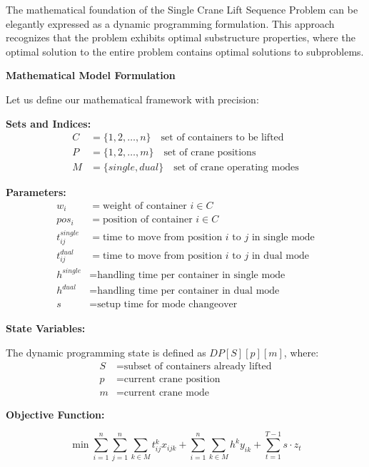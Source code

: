 \documentclass{article}
\begin{document}
The mathematical foundation of the Single Crane Lift Sequence Problem can be elegantly expressed as a dynamic programming formulation. This approach recognizes that the problem exhibits optimal substructure properties, where the optimal solution to the entire problem contains optimal solutions to subproblems.

\textbf{Mathematical Model Formulation}

Let us define our mathematical framework with precision:

\textbf{Sets and Indices:}
\begin{align}
C &= \{1, 2, \ldots, n\} \quad \text{set of containers to be lifted}\\
P &= \{1, 2, \ldots, m\} \quad \text{set of crane positions}\\
M &= \{single, dual\} \quad \text{set of crane operating modes}
\end{align}

\textbf{Parameters:}
\begin{align}
w_i &= \text{weight of container } i \in C\\
pos_i &= \text{position of container } i \in C\\
t_{ij}^{single} &= \text{time to move from position } i \text{ to } j \text{ in single mode}\\
t_{ij}^{dual} &= \text{time to move from position } i \text{ to } j \text{ in dual mode}\\
h^{single} &= \text{handling time per container in single mode}\\
h^{dual} &= \text{handling time per container in dual mode}\\
s &= \text{setup time for mode changeover}
\end{align}

\textbf{State Variables:}

The dynamic programming state is defined as $DP[S][p][m]$, where:
\begin{align}
S &= \text{subset of containers already lifted}\\
p &= \text{current crane position}\\
m &= \text{current crane mode}
\end{align}

\textbf{Objective Function:}

\begin{equation}
\min \sum_{i=1}^{n} \sum_{j=1}^{n} \sum_{k \in M} t_{ij}^k x_{ijk} + \sum_{i=1}^{n} \sum_{k \in M} h^k y_{ik} + \sum_{t=1}^{T-1} s \cdot z_t
\end{equation}
\end{document}
